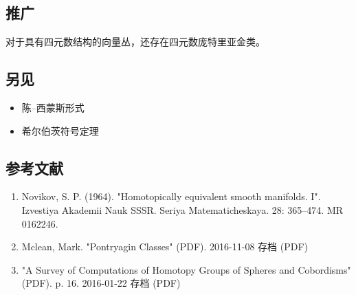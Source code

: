 \subsection{推广}
对于具有四元数结构的向量丛，还存在四元数庞特里亚金类。
\subsection{另见}
\begin{itemize}
\item 陈–西蒙斯形式
\item 希尔伯茨符号定理
\end{itemize}
\subsection{参考文献}
\begin{enumerate}
\item Novikov, S. P. (1964). "Homotopically equivalent smooth manifolds. I". Izvestiya Akademii Nauk SSSR. Seriya Matematicheskaya. 28: 365–474. MR 0162246.
\item Mclean, Mark. "Pontryagin Classes" (PDF). 2016-11-08 存档 (PDF) 
\item "A Survey of Computations of Homotopy Groups of Spheres and Cobordisms" (PDF). p. 16. 2016-01-22 存档 (PDF) 
\end{enumerate}